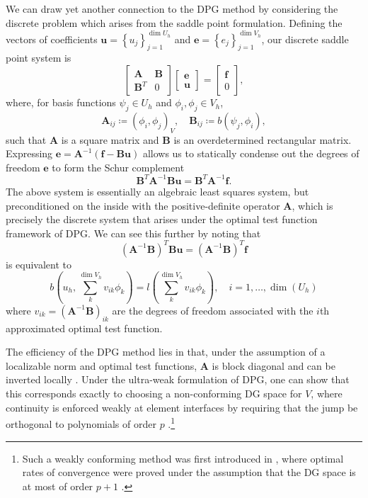 \documentclass[final,leqno]{siamltex}
\newcommand{\bs}[1]{\boldsymbol{#1}}
\newcommand{\LRp}[1]{\left( #1 \right)}
\newcommand{\LRc}[1]{\left\{ #1 \right\}}
\begin{document}
We can draw yet another connection to the DPG method by considering the discrete problem which arises from the saddle point formulation.  Defining the vectors of coefficients $\bs{u} = \LRc{u_j}_{j=1}^{\dim{U_h}}$ and $\bs{e} = \LRc{e_j}_{j=1}^{\dim{V_h}}$, our discrete saddle point system is
\[
\left[\begin{array}{cc} \bs{A} &\bs{B}\\ \bs{B}^T&{0}\end{array}\right]\left[\begin{array}{c}\bs{e}\\ \bs{u}\end{array}\right] = \left[\begin{array}{c}\bs{f}\\ 0\end{array}\right],
\]
where, for basis functions $\psi_j\in U_h$ and $\phi_i,\phi_j\in V_h$, 
\[
\bs{A}_{ij} \coloneqq \LRp{\phi_i,\phi_j}_V, \quad \bs{B}_{ij} \coloneqq b\LRp{\psi_j,\phi_i},
\]
such that $\bs{A}$ is a square matrix and $\bs{B}$ is an overdetermined rectangular matrix.  Expressing $\bs{e} = \bs{A}^{-1}\LRp{\bs{f}-\bs{B}\bs{u}}$ allows us to statically condense out the degrees of freedom $\bs{e}$ to form the Schur complement
\[
\bs{B}^T \bs{A}^{-1}\bs{B} \bs{u} = \bs{B}^T \bs{A}^{-1}\bs{f}.
\]
The above system is essentially an algebraic least squares system, but preconditioned on the inside with the positive-definite operator $\bs{A}$, which is precisely the discrete system that arises under the optimal test function framework of DPG.  We can see this further by noting that 
\[
\LRp{\bs{A}^{-1}\bs{B}}^T\bs{B} \bs{u} = \LRp{\bs{A}^{-1}\bs{B}}^T\bs{f} 
\]
is equivalent to 
\[
b\LRp{u_h, \sum_k^{\dim{V_h}} v_{ik}\phi_k} = l\LRp{\sum_k^{\dim{V_h}} v_{ik}\phi_k}, \quad i = 1,\ldots,\dim(U_h)
\]
where $v_{ik} = \LRp{\bs{A}^{-1}\bs{B}}_{ik}$ are the degrees of freedom associated with the $i$th approximated optimal test function.

The efficiency of the DPG method lies in that, under the assumption of a localizable norm and optimal test functions, $\bs{A}$ is block diagonal and can be inverted locally \cite{overviewDPG}.  Under the ultra-weak formulation of DPG, one can show that this corresponds exactly to choosing a non-conforming DG space for $V$, where continuity is enforced weakly at element interfaces by requiring that the jump be orthogonal to polynomials of order $p$ \cite{globalLocalDPG}.\footnote{Such a weakly conforming method was first introduced in \cite{brenner2008mathematical}, where optimal rates of convergence were proved under the assumption that the DG space is at most of order $p+1$ .}  
\end{document}
